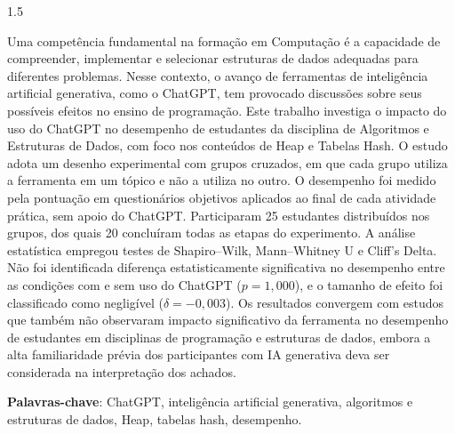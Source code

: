 
\begin{resumo}[RESUMO]
\begin{Spacing}{1.5}

Uma competência fundamental na formação em Computação é a capacidade de compreender, implementar e selecionar estruturas de dados adequadas para diferentes problemas. Nesse contexto, o avanço de ferramentas de inteligência artificial generativa, como o ChatGPT, tem provocado discussões sobre seus possíveis efeitos no ensino de programação. Este trabalho investiga o impacto do uso do ChatGPT no desempenho de estudantes da disciplina de Algoritmos e Estruturas de Dados, com foco nos conteúdos de Heap e Tabelas Hash. O estudo adota um desenho experimental com grupos cruzados, em que cada grupo utiliza a ferramenta em um tópico e não a utiliza no outro. O desempenho foi medido pela pontuação em questionários objetivos aplicados ao final de cada atividade prática, sem apoio do ChatGPT. Participaram 25 estudantes distribuídos nos grupos, dos quais 20 concluíram todas as etapas do experimento. A análise estatística empregou testes de Shapiro--Wilk, Mann--Whitney U e Cliff's Delta. Não foi identificada diferença estatisticamente significativa no desempenho entre as condições com e sem uso do ChatGPT ($p = 1{,}000$), e o tamanho de efeito foi classificado como negligível ($\delta = -0{,}003$). Os resultados convergem com estudos que também não observaram impacto significativo da ferramenta no desempenho de estudantes em disciplinas de programação e estruturas de dados, embora a alta familiaridade prévia dos participantes com IA generativa deva ser considerada na interpretação dos achados.
\end{Spacing}
\vspace{1cm}
\textbf{Palavras-chave}: ChatGPT, inteligência artificial generativa, algoritmos e estruturas de dados, Heap, tabelas hash, desempenho.

\end{resumo}


